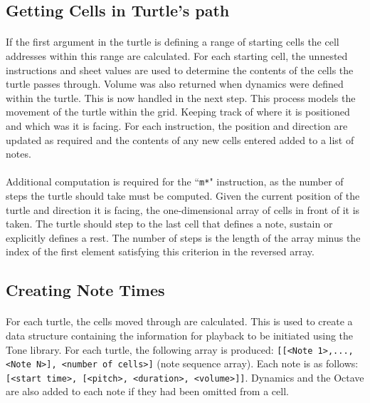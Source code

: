 \subsection{Getting Cells in Turtle's path}

\paragraph{} If the first argument in the turtle is defining a range of starting cells the cell addresses within this range are calculated. For each starting cell, the unnested instructions and sheet values are used to determine the contents of the cells the turtle passes through. Volume was also returned when dynamics were defined within the turtle. This is now handled in the next step. This process models the movement of the turtle within the grid. Keeping track of where it is positioned and which was it is facing. For each instruction, the position and direction are updated as required and the contents of any new cells entered added to a list of notes.

\paragraph{} Additional computation is required for the ``\texttt{m*}" instruction, as the number of steps the turtle should take must be computed. Given the current position of the turtle and direction it is facing, the one-dimensional array of cells in front of it is taken. The turtle should step to the last cell that defines a note, sustain or explicitly defines a rest. The number of steps is the length of the array minus the index of the first element satisfying this criterion in the reversed array.

\subsection{Creating Note Times}

\paragraph{} For each turtle, the cells moved through are calculated. This is used to create a data structure containing the information for playback to be initiated using the Tone library. For each turtle, the following array is produced: \texttt{[[<Note 1>,...,<Note N>], <number of cells>]} (note sequence array). Each note is as follows: \texttt{[<start time>, [<pitch>, <duration>, <volume>]]}. Dynamics and the Octave are also added to each note if they had been omitted from a cell.

